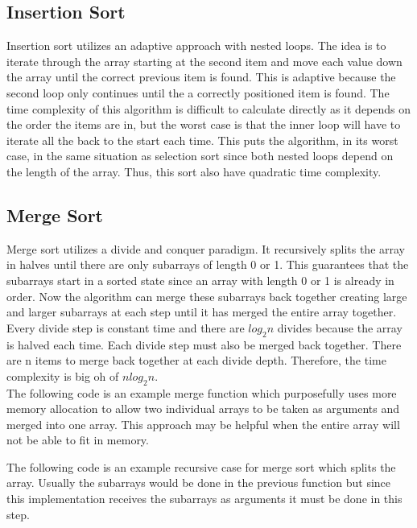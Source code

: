 \documentclass[letterpaper, 10pt]{article}
\begin{document}
\subsection{Insertion Sort}
Insertion sort utilizes an adaptive approach with nested loops. The idea is to
iterate through the array starting at the second item and move each value 
down the array until the correct previous item is found. 
This is adaptive because the second loop only continues until the a correctly positioned item is found.
The time complexity of this algorithm is difficult to calculate directly as it depends on the order the items
are in, but the worst case is that the inner loop will have to iterate all the back to the start each time.
This puts the algorithm, in its worst case, in the same situation as selection sort since both nested loops depend on the length
of the array. Thus, this sort also have quadratic time complexity.

\subsection{Merge Sort}
Merge sort utilizes a divide and conquer paradigm. It recursively splits the array in halves
until there are only subarrays of length 0 or 1. This guarantees that the subarrays start in a sorted
state since an array with length 0 or 1 is already in order. Now the algorithm can merge these
subarrays back together creating large and larger subarrays at each step until it has
merged the entire array together. Every divide step is constant time and there are \(log_2n \) divides because
the array is halved each time. Each divide step must also be merged back together. There are n items to
merge back together at each divide depth. Therefore, the time complexity is big oh of \(nlog_2n\). \\
\newline
The following code is an example merge function which purposefully uses more memory allocation
to allow two individual arrays to be taken as arguments and merged into one array. This
approach may be helpful when the entire array will not be able to fit in memory.

\pagebreak
The following code is an example recursive case for merge sort which splits the array.
Usually the subarrays would be done in the previous function but since this implementation
receives the subarrays as arguments it must be done in this step.

\end{document}
